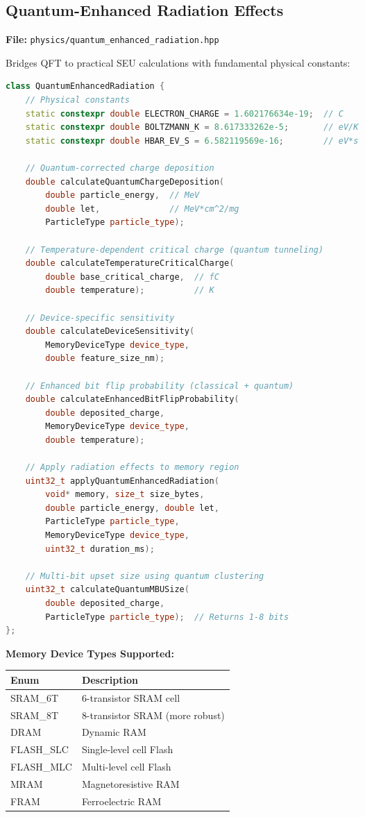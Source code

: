 \documentclass[11pt,a4paper]{article}
\begin{document}
\subsection{Quantum-Enhanced Radiation Effects}

\textbf{File:} \texttt{physics/quantum\_enhanced\_radiation.hpp}

Bridges QFT to practical SEU calculations with fundamental physical constants:

\begin{lstlisting}[language=C++, basicstyle=\footnotesize\ttfamily]
class QuantumEnhancedRadiation {
    // Physical constants
    static constexpr double ELECTRON_CHARGE = 1.602176634e-19;  // C
    static constexpr double BOLTZMANN_K = 8.617333262e-5;       // eV/K
    static constexpr double HBAR_EV_S = 6.582119569e-16;        // eV*s

    // Quantum-corrected charge deposition
    double calculateQuantumChargeDeposition(
        double particle_energy,  // MeV
        double let,              // MeV*cm^2/mg
        ParticleType particle_type);

    // Temperature-dependent critical charge (quantum tunneling)
    double calculateTemperatureCriticalCharge(
        double base_critical_charge,  // fC
        double temperature);          // K

    // Device-specific sensitivity
    double calculateDeviceSensitivity(
        MemoryDeviceType device_type,
        double feature_size_nm);

    // Enhanced bit flip probability (classical + quantum)
    double calculateEnhancedBitFlipProbability(
        double deposited_charge,
        MemoryDeviceType device_type,
        double temperature);

    // Apply radiation effects to memory region
    uint32_t applyQuantumEnhancedRadiation(
        void* memory, size_t size_bytes,
        double particle_energy, double let,
        ParticleType particle_type,
        MemoryDeviceType device_type,
        uint32_t duration_ms);

    // Multi-bit upset size using quantum clustering
    uint32_t calculateQuantumMBUSize(
        double deposited_charge,
        ParticleType particle_type);  // Returns 1-8 bits
};
\end{lstlisting}

\textbf{Memory Device Types Supported:}
\begin{table}[htbp]
\centering
\begin{tabular}{@{}ll@{}}
\toprule
\textbf{Enum} & \textbf{Description} \\
\midrule
SRAM\_6T & 6-transistor SRAM cell \\
SRAM\_8T & 8-transistor SRAM (more robust) \\
DRAM & Dynamic RAM \\
FLASH\_SLC & Single-level cell Flash \\
FLASH\_MLC & Multi-level cell Flash \\
MRAM & Magnetoresistive RAM \\
FRAM & Ferroelectric RAM \\
\bottomrule
\end{tabular}
\end{table}
\end{document}
